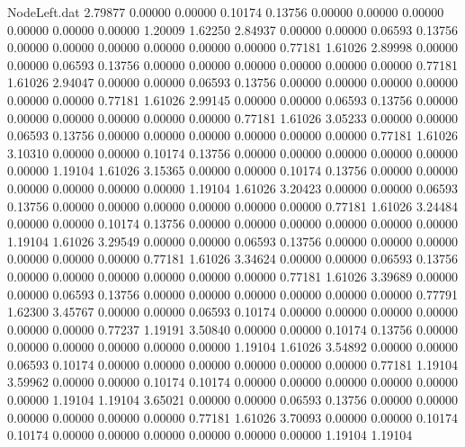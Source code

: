 \begin{filecontents}{NodeLeft.dat}
   2.79877    0.00000    0.00000     0.10174    0.13756    0.00000    0.00000    0.00000    0.00000    0.00000    0.00000    1.20009    1.62250
   2.84937    0.00000    0.00000     0.06593    0.13756    0.00000    0.00000    0.00000    0.00000    0.00000    0.00000    0.77181    1.61026
   2.89998    0.00000    0.00000     0.06593    0.13756    0.00000    0.00000    0.00000    0.00000    0.00000    0.00000    0.77181    1.61026
   2.94047    0.00000    0.00000     0.06593    0.13756    0.00000    0.00000    0.00000    0.00000    0.00000    0.00000    0.77181    1.61026
   2.99145    0.00000    0.00000     0.06593    0.13756    0.00000    0.00000    0.00000    0.00000    0.00000    0.00000    0.77181    1.61026
   3.05233    0.00000    0.00000     0.06593    0.13756    0.00000    0.00000    0.00000    0.00000    0.00000    0.00000    0.77181    1.61026
   3.10310    0.00000    0.00000     0.10174    0.13756    0.00000    0.00000    0.00000    0.00000    0.00000    0.00000    1.19104    1.61026
   3.15365    0.00000    0.00000     0.10174    0.13756    0.00000    0.00000    0.00000    0.00000    0.00000    0.00000    1.19104    1.61026
   3.20423    0.00000    0.00000     0.06593    0.13756    0.00000    0.00000    0.00000    0.00000    0.00000    0.00000    0.77181    1.61026
   3.24484    0.00000    0.00000     0.10174    0.13756    0.00000    0.00000    0.00000    0.00000    0.00000    0.00000    1.19104    1.61026
   3.29549    0.00000    0.00000     0.06593    0.13756    0.00000    0.00000    0.00000    0.00000    0.00000    0.00000    0.77181    1.61026
   3.34624    0.00000    0.00000     0.06593    0.13756    0.00000    0.00000    0.00000    0.00000    0.00000    0.00000    0.77181    1.61026
   3.39689    0.00000    0.00000     0.06593    0.13756    0.00000    0.00000    0.00000    0.00000    0.00000    0.00000    0.77791    1.62300
   3.45767    0.00000    0.00000     0.06593    0.10174    0.00000    0.00000    0.00000    0.00000    0.00000    0.00000    0.77237    1.19191
   3.50840    0.00000    0.00000     0.10174    0.13756    0.00000    0.00000    0.00000    0.00000    0.00000    0.00000    1.19104    1.61026
   3.54892    0.00000    0.00000     0.06593    0.10174    0.00000    0.00000    0.00000    0.00000    0.00000    0.00000    0.77181    1.19104
   3.59962    0.00000    0.00000     0.10174    0.10174    0.00000    0.00000    0.00000    0.00000    0.00000    0.00000    1.19104    1.19104
   3.65021    0.00000    0.00000     0.06593    0.13756    0.00000    0.00000    0.00000    0.00000    0.00000    0.00000    0.77181    1.61026
   3.70093    0.00000    0.00000     0.10174    0.10174    0.00000    0.00000    0.00000    0.00000    0.00000    0.00000    1.19104    1.19104

\end{filecontents}
